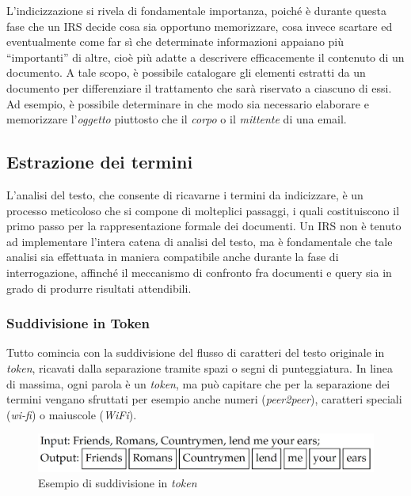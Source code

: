 L’indicizzazione si rivela di fondamentale importanza, poiché è durante questa fase che un IRS decide cosa sia opportuno memorizzare, cosa invece scartare ed eventualmente come far sì che determinate informazioni appaiano più “importanti” di altre, cioè più adatte a descrivere efficacemente il contenuto di un documento. A tale scopo, è possibile catalogare gli elementi estratti da un documento per differenziare il trattamento che sarà riservato a ciascuno di essi. Ad esempio, è possibile determinare in che modo sia necessario elaborare e memorizzare l’\textit{oggetto} piuttosto che il \textit{corpo} o il \textit{mittente} di una email.


\subsection{Estrazione dei termini}

L’analisi del testo, che consente di ricavarne i termini da indicizzare, è un processo meticoloso che si compone di molteplici passaggi, i quali costituiscono il primo passo per la rappresentazione formale dei documenti. Un IRS non è tenuto ad implementare l’intera catena di analisi del testo, ma è fondamentale che tale analisi sia effettuata in maniera compatibile anche durante la fase di interrogazione, affinché il meccanismo di confronto fra documenti e query sia in grado di produrre risultati attendibili.


\subsubsection{Suddivisione in Token}

Tutto comincia con la suddivisione del flusso di caratteri del testo originale in \textit{token}, ricavati dalla separazione tramite spazi o segni di punteggiatura. In linea di massima, ogni parola è un \textit{token}, ma può capitare che per la separazione dei termini vengano sfruttati per esempio anche numeri (\textit{peer2peer}), caratteri speciali (\textit{wi-fi}) o maiuscole (\textit{WiFi}).

\begin{figure}[H]
	\centering
	\includegraphics[scale=0.33]{../images/01_2_esempio_token}
	\caption[Esempio di suddivisione in \textit{token}]{Esempio di suddivisione in \textit{token}}
	\label{fig:tokenexample}
\end{figure}

